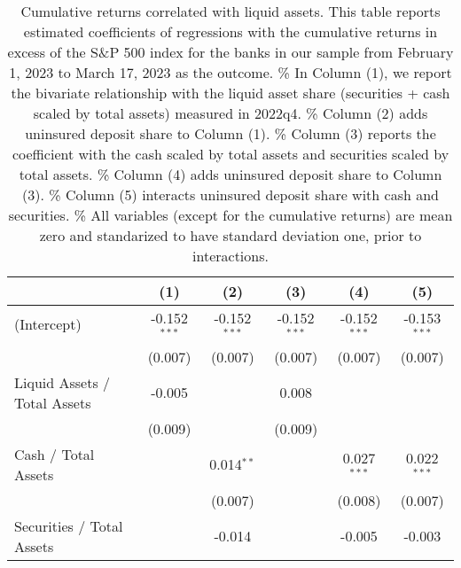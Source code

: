 
\begin{table}[htbp]
   \caption{\label{tab:liquid_assets} Cumulative returns correlated with liquid assets. This table reports estimated coefficients of regressions with the cumulative returns in excess of the S\&P 500 index for the banks in our sample from February 1, 2023 to March 17, 2023 as the outcome. \%
      In Column (1), we report the bivariate relationship with the liquid asset share (securities + cash scaled by total
   assets) measured in 2022q4. \%
      Column (2) adds uninsured deposit share to Column (1). \%
      Column (3) reports the coefficient with the cash scaled by total assets and securities scaled by total assets. \%
       Column (4) adds uninsured deposit share to Column (3). \%
       Column (5) interacts uninsured deposit share with cash and securities. \%
       All variables (except for the cumulative returns) are mean zero and standarized to have standard deviation one, prior to interactions.}
   \bigskip
   \centering
   \begin{adjustbox}{width = 1.2\textwidth, center}
      \begin{tabular}{lccccc}
         \toprule
                                                                     & (1)            & (2)            & (3)            & (4)            & (5)\\  
         \midrule 
         (Intercept)                                                 & -0.152$^{***}$ & -0.152$^{***}$ & -0.152$^{***}$ & -0.152$^{***}$ & -0.153$^{***}$\\   
                                                                     & (0.007)        & (0.007)        & (0.007)        & (0.007)        & (0.007)\\   
         Liquid Assets / Total Assets                                & -0.005         &                & 0.008          &                &   \\   
                                                                     & (0.009)        &                & (0.009)        &                &   \\   
         Cash / Total Assets                                         &                & 0.014$^{**}$   &                & 0.027$^{***}$  & 0.022$^{***}$\\   
                                                                     &                & (0.007)        &                & (0.008)        & (0.007)\\   
         Securities / Total Assets                                   &                & -0.014         &                & -0.005         & -0.003\\   

\end{tabular}
\end{adjustbox}
\end{table}
